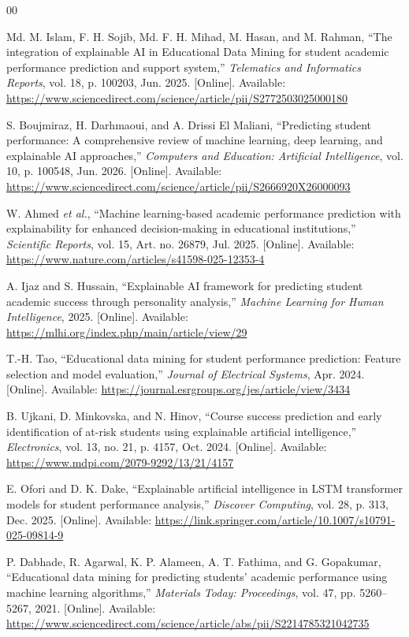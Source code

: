 \documentclass[conference]{IEEEtran}
\begin{document}
\begin{thebibliography}{00}

Md. M. Islam, F. H. Sojib, Md. F. H. Mihad, M. Hasan, and M. Rahman,
“The integration of explainable AI in Educational Data Mining for student academic performance prediction and support system,”
\textit{Telematics and Informatics Reports}, vol. 18, p. 100203, Jun. 2025.
[Online]. Available: \url{https://www.sciencedirect.com/science/article/pii/S2772503025000180}

S. Boujmiraz, H. Darhmaoui, and A. Drissi El Maliani,
“Predicting student performance: A comprehensive review of machine learning, deep learning, and explainable AI approaches,”
\textit{Computers and Education: Artificial Intelligence}, vol. 10, p. 100548, Jun. 2026.
[Online]. Available: \url{https://www.sciencedirect.com/science/article/pii/S2666920X26000093}

W. Ahmed \textit{et al.},
“Machine learning-based academic performance prediction with explainability for enhanced decision-making in educational institutions,”
\textit{Scientific Reports}, vol. 15, Art. no. 26879, Jul. 2025.
[Online]. Available: \url{https://www.nature.com/articles/s41598-025-12353-4}

A. Ijaz and S. Hussain,
“Explainable AI framework for predicting student academic success through personality analysis,”
\textit{Machine Learning for Human Intelligence}, 2025.
[Online]. Available: \url{https://mlhi.org/index.php/main/article/view/29}

T.-H. Tao,
“Educational data mining for student performance prediction: Feature selection and model evaluation,”
\textit{Journal of Electrical Systems}, Apr. 2024.
[Online]. Available: \url{https://journal.esrgroups.org/jes/article/view/3434}

B. Ujkani, D. Minkovska, and N. Hinov,
“Course success prediction and early identification of at-risk students using explainable artificial intelligence,”
\textit{Electronics}, vol. 13, no. 21, p. 4157, Oct. 2024.
[Online]. Available: \url{https://www.mdpi.com/2079-9292/13/21/4157}

E. Ofori and D. K. Dake,
“Explainable artificial intelligence in LSTM transformer models for student performance analysis,”
\textit{Discover Computing}, vol. 28, p. 313, Dec. 2025.
[Online]. Available: \url{https://link.springer.com/article/10.1007/s10791-025-09814-9}

P. Dabhade, R. Agarwal, K. P. Alameen, A. T. Fathima, and G. Gopakumar,
“Educational data mining for predicting students’ academic performance using machine learning algorithms,”
\textit{Materials Today: Proceedings}, vol. 47, pp. 5260--5267, 2021.
[Online]. Available: \url{https://www.sciencedirect.com/science/article/abs/pii/S2214785321042735}

\end{thebibliography}
\end{document}
